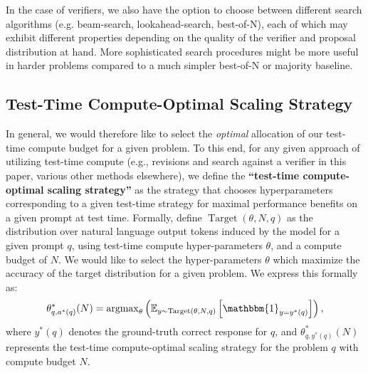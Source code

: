 \documentclass[11pt, letterpaper, logo]{googledeepmind}
\begin{document}
In the case of verifiers, we also have the option to choose between different search algorithms (e.g. beam-search, lookahead-search, best-of-N), each of which may exhibit different properties depending on the quality of the verifier and proposal distribution at hand. More sophisticated search procedures might be more useful in harder problems compared to a much simpler best-of-N or majority baseline.

\vspace{-0.3cm}
\subsection{Test-Time Compute-Optimal Scaling Strategy}
\vspace{-0.2cm}
In general, we would therefore like to select the \emph{optimal} allocation of our test-time compute budget for a given problem. To this end, for any given approach of utilizing test-time compute (e.g., revisions and search against a verifier in this paper, various other methods elsewhere), we define the \textbf{``test-time compute-optimal scaling strategy''} as the strategy that chooses hyperparameters corresponding to a given test-time strategy for maximal performance benefits on a given prompt at test time. Formally, define $\operatorname{Target}(\theta, N, q)$ as the distribution over natural language output tokens induced by the model for a given prompt $q$, using test-time compute hyper-parameters $\theta$, and a compute budget of $N$. We would like to select the hyper-parameters $\theta$ which maximize the accuracy of the target distribution for a given problem. We express this formally as:
\begin{align}
\label{eq:test_time_compute_optimal}
    \theta^{*}_{q,a^*(q)}(N) = \operatorname{argmax}_{\theta} \left( \mathbb{E}_{y \sim \operatorname{Target}(\theta, N, q)} \left[ \mathbbm{1}_{y = y^*(q)} \right] \right),
\end{align}
where $y^*(q)$ denotes the ground-truth correct response for $q$, and $\theta^{*}_{q,y^*(q)}(N)$ represents the test-time compute-optimal scaling strategy for the problem $q$ with compute budget $N$.


\vspace{-0.2cm}
\end{document}
